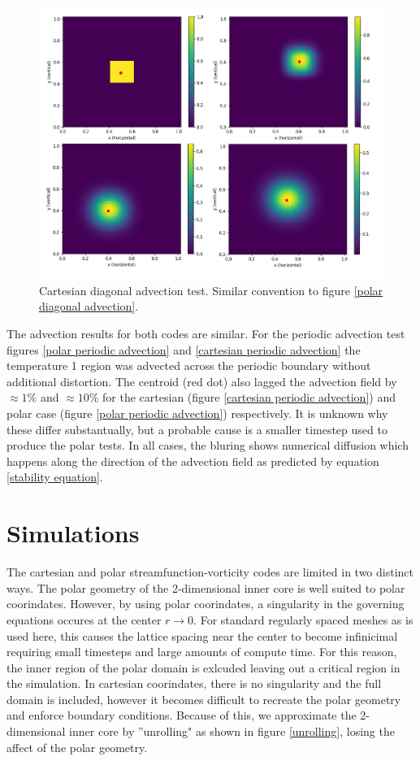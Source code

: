 \documentclass{article}
\begin{document}
\begin{figure}[h!]
	\centering 
	\includegraphics{cartesianDiagonal/CartesianDiagonalFigure.jpg}
	\caption{Cartesian diagonal advection test. Similar convention to figure \ref{polar diagonal advection}. }
	\label{cartesian diagonal advection}
\end{figure}

\noindent The advection results for both codes are similar. For the periodic advection test figures \ref{polar periodic advection} and \ref{cartesian periodic advection} the temperature 1 region was advected across the periodic boundary without additional distortion. The centroid (red dot) also lagged the advection field by $\approx 1 \%$ and $\approx 10 \%$ for the cartesian (figure \ref{cartesian periodic advection}) and polar case (figure \ref{polar periodic advection}) respectively. It is unknown why these differ substantually, but a probable cause is a smaller timestep used to produce the polar tests. In all cases, the bluring shows numerical diffusion which happens along the direction of the advection field as predicted by equation \ref{stability equation}.


\section*{Simulations}

The cartesian and polar streamfunction-vorticity codes are limited in two 
distinct ways. The polar geometry of the 2-dimensional inner core is well 
suited to polar coorindates. However, by using polar coorindates, a 
singularity in the governing equations occures at the center 
$r \rightarrow 0$. For standard regularly spaced meshes as is used here, 
this causes the lattice spacing near the center to become infinicimal 
requiring small timesteps and large amounts of compute time. For this 
reason, the inner region of the polar domain is exlcuded leaving out a 
critical region in the simulation. In cartesian coorindates, there is no 
singularity and the full domain is included, however it becomes difficult 
to recreate the polar geometry and enforce boundary conditions. Because of 
this, we approximate the 2-dimensional inner core by ''unrolling" as shown 
in figure \ref{unrolling}, losing the affect of the polar geometry. 
\end{document}

